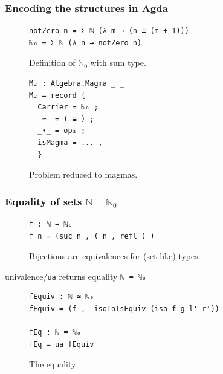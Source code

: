 \documentclass[english]{beamer}
\begin{document}
\begin{frame}[fragile]
\frametitle{Encoding the structures in Agda}




\begin{figure}
\begin{BVerbatim}
notZero n = Σ ℕ (λ m → (n ≡ (m + 1)))
ℕ₀ = Σ ℕ (λ n → notZero n) 
\end{BVerbatim}
\caption{Definition of $\mathbb{N}_0$ with sum type.}
\end{figure}


\begin{figure}
\begin{BVerbatim}
M₂ : Algebra.Magma _ _
M₂ = record { 
  Carrier = ℕ₀ ;
  _≈_ = (_≡_) ;
  _∙_ = op₂ ;
  isMagma = ... ,
  }
 \end{BVerbatim}
 \caption{Problem reduced to magmas.}
\end{figure}


\end{frame}

\begin{frame}[fragile]
\frametitle{Equality of sets $\mathbb{N} = \mathbb{N}_0$}


\begin{figure}
\begin{BVerbatim}
f : ℕ → ℕ₀ 
f n = (suc n , ( n , refl ) )
\end{BVerbatim}
\caption{Bijections are equivalences for (set-like) types}
\end{figure}

 univalence/\texttt{ua} returns equality \texttt{ℕ ≡ ℕ₀}
 
 
 \begin{figure}
 \begin{BVerbatim}
fEquiv : ℕ ≃ ℕ₀ 
fEquiv = (f ,  isoToIsEquiv (iso f g l' r'))

fEq : ℕ ≡ ℕ₀ 
fEq = ua fEquiv
 \end{BVerbatim}
 \caption{The equality}
\end{figure}

\end{frame}
\end{document}
